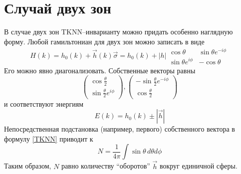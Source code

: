 \section{Случай двух зон}
В случае двух зон $\mathrm{TKNN}$--инварианту можно придать особенно наглядную 
форму. Любой гамильтониан для двух зон можно записать в виде
\begin{equation}
    H(k) = h_0(k) + \vec{h}(k)\vec{\sigma} = h_0(k) + |h|
            \begin{matrix}
                \cos{\theta} & \sin{\theta}e^{-i\phi} \\
                \sin{\theta}e^{i\phi} & -\cos{\theta}
            \end{matrix}
\end{equation}
Его можно явно диагонализовать. Собственные векторы равны
\begin{equation}
    \left(\begin{matrix}
        \cos{\frac{\theta}{2}} \\
        \sin{\frac{\theta}{2}}e^{i\phi}
    \end{matrix}\right),
    \left(\begin{matrix}
        -\sin{\frac{\theta}{2}}e^{-i\phi}\\
        \cos{\frac{\theta}{2}} 
    \end{matrix}\right)
\end{equation}
и соответствуют энергиям 
\begin{equation}
    E(k) = h_0(k) \pm |\vec{h}|
\end{equation}
Непосредственная подстановка (например, первого) собственного вектора в формулу \eqref{TKNN}
приводит к 
\begin{equation}
    N = \frac{1}{4\pi} \int \sin{\theta}\,d\theta d\phi
\end{equation}
Таким образом, $N$ равно количеству ``оборотов'' $\vec{h}$ вокруг единичной сферы.
